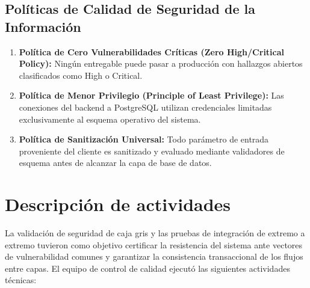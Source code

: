 \documentclass[12pt,a4paper]{article}
\begin{document}
\subsection{Políticas de Calidad de Seguridad de la Información}
\begin{enumerate}[leftmargin=1.5em, itemsep=2pt]
    \item \textbf{Política de Cero Vulnerabilidades Críticas (Zero High/Critical Policy):} Ningún entregable puede pasar a producción con hallazgos abiertos clasificados como High o Critical.
    \item \textbf{Política de Menor Privilegio (Principle of Least Privilege):} Las conexiones del backend a PostgreSQL utilizan credenciales limitadas exclusivamente al esquema operativo del sistema.
    \item \textbf{Política de Sanitización Universal:} Todo parámetro de entrada proveniente del cliente es sanitizado y evaluado mediante validadores de esquema antes de alcanzar la capa de base de datos.
\end{enumerate}

\section{Descripción de actividades}
La validación de seguridad de caja gris y las pruebas de integración de extremo a extremo tuvieron como objetivo certificar la resistencia del sistema ante vectores de vulnerabilidad comunes y garantizar la consistencia transaccional de los flujos entre capas. El equipo de control de calidad ejecutó las siguientes actividades técnicas:
\end{document}
